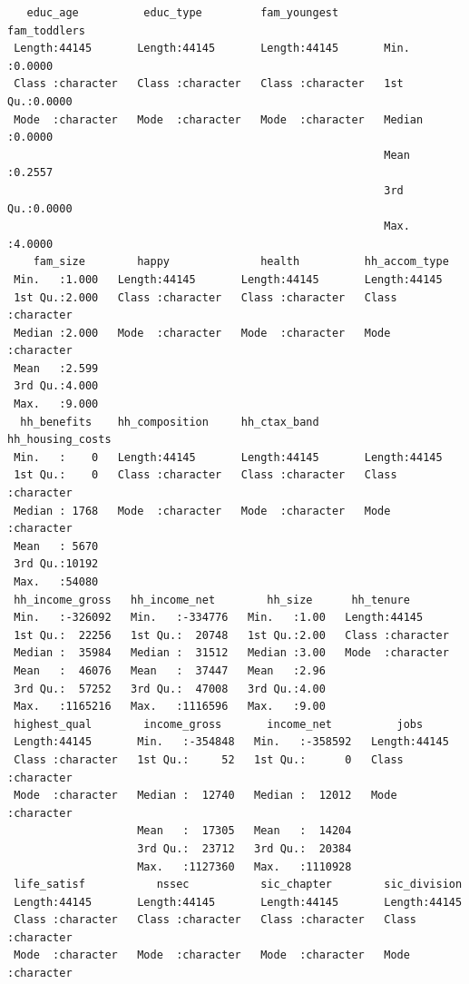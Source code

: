 \documentclass[
  letterpaper,
  DIV=11,
  numbers=noendperiod]{scrreprt}
\begin{document}
\begin{verbatim}
   educ_age          educ_type         fam_youngest        fam_toddlers   
 Length:44145       Length:44145       Length:44145       Min.   :0.0000  
 Class :character   Class :character   Class :character   1st Qu.:0.0000  
 Mode  :character   Mode  :character   Mode  :character   Median :0.0000  
                                                          Mean   :0.2557  
                                                          3rd Qu.:0.0000  
                                                          Max.   :4.0000  
    fam_size        happy              health          hh_accom_type     
 Min.   :1.000   Length:44145       Length:44145       Length:44145      
 1st Qu.:2.000   Class :character   Class :character   Class :character  
 Median :2.000   Mode  :character   Mode  :character   Mode  :character  
 Mean   :2.599                                                           
 3rd Qu.:4.000                                                           
 Max.   :9.000                                                           
  hh_benefits    hh_composition     hh_ctax_band       hh_housing_costs  
 Min.   :    0   Length:44145       Length:44145       Length:44145      
 1st Qu.:    0   Class :character   Class :character   Class :character  
 Median : 1768   Mode  :character   Mode  :character   Mode  :character  
 Mean   : 5670                                                           
 3rd Qu.:10192                                                           
 Max.   :54080                                                           
 hh_income_gross   hh_income_net        hh_size      hh_tenure        
 Min.   :-326092   Min.   :-334776   Min.   :1.00   Length:44145      
 1st Qu.:  22256   1st Qu.:  20748   1st Qu.:2.00   Class :character  
 Median :  35984   Median :  31512   Median :3.00   Mode  :character  
 Mean   :  46076   Mean   :  37447   Mean   :2.96                     
 3rd Qu.:  57252   3rd Qu.:  47008   3rd Qu.:4.00                     
 Max.   :1165216   Max.   :1116596   Max.   :9.00                     
 highest_qual        income_gross       income_net          jobs          
 Length:44145       Min.   :-354848   Min.   :-358592   Length:44145      
 Class :character   1st Qu.:     52   1st Qu.:      0   Class :character  
 Mode  :character   Median :  12740   Median :  12012   Mode  :character  
                    Mean   :  17305   Mean   :  14204                     
                    3rd Qu.:  23712   3rd Qu.:  20384                     
                    Max.   :1127360   Max.   :1110928                     
 life_satisf           nssec           sic_chapter        sic_division      
 Length:44145       Length:44145       Length:44145       Length:44145      
 Class :character   Class :character   Class :character   Class :character  
 Mode  :character   Mode  :character   Mode  :character   Mode  :character  
                                                                            

\end{verbatim}
\end{document}
